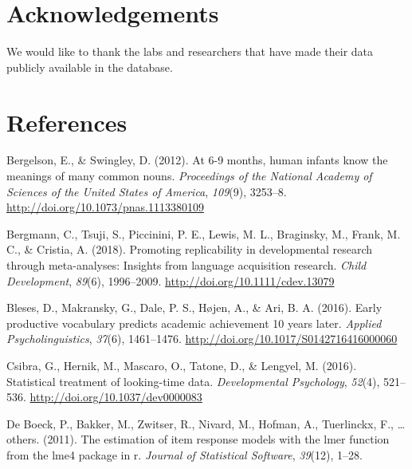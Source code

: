 \documentclass[10pt, letterpaper]{article}
\begin{document}
\hypertarget{acknowledgements}{%
\section{Acknowledgements}\label{acknowledgements}}

We would like to thank the labs and researchers that have made their
data publicly available in the database.

\hypertarget{references}{%
\section{References}\label{references}}

\setlength{\parindent}{-0.1in} 
\setlength{\leftskip}{0.125in}

\noindent

\hypertarget{refs}{}
\leavevmode\hypertarget{ref-Bergelson2012a}{}%
Bergelson, E., \& Swingley, D. (2012). At 6-9 months, human infants know
the meanings of many common nouns. \emph{Proceedings of the National
Academy of Sciences of the United States of America}, \emph{109}(9),
3253--8. \url{http://doi.org/10.1073/pnas.1113380109}

\leavevmode\hypertarget{ref-Bergmann2018}{}%
Bergmann, C., Tsuji, S., Piccinini, P. E., Lewis, M. L., Braginsky, M.,
Frank, M. C., \& Cristia, A. (2018). Promoting replicability in
developmental research through meta-analyses: Insights from language
acquisition research. \emph{Child Development}, \emph{89}(6),
1996--2009. \url{http://doi.org/10.1111/cdev.13079}

\leavevmode\hypertarget{ref-Bleses2016}{}%
Bleses, D., Makransky, G., Dale, P. S., Højen, A., \& Ari, B. A. (2016).
Early productive vocabulary predicts academic achievement 10 years
later. \emph{Applied Psycholinguistics}, \emph{37}(6), 1461--1476.
\url{http://doi.org/10.1017/S0142716416000060}

\leavevmode\hypertarget{ref-Csibra2016}{}%
Csibra, G., Hernik, M., Mascaro, O., Tatone, D., \& Lengyel, M. (2016).
Statistical treatment of looking-time data. \emph{Developmental
Psychology}, \emph{52}(4), 521--536.
\url{http://doi.org/10.1037/dev0000083}

\leavevmode\hypertarget{ref-de-boeck2011}{}%
De Boeck, P., Bakker, M., Zwitser, R., Nivard, M., Hofman, A.,
Tuerlinckx, F., \ldots{} others. (2011). The estimation of item response
models with the lmer function from the lme4 package in r. \emph{Journal
of Statistical Software}, \emph{39}(12), 1--28.
\end{document}
